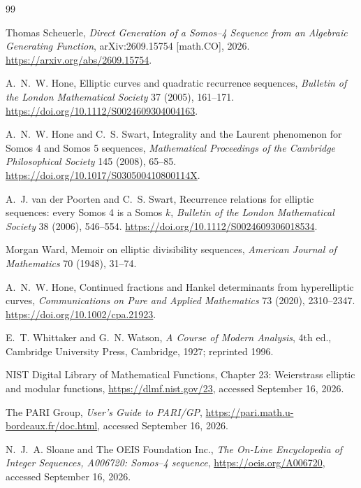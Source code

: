\documentclass[11pt]{article}
\begin{document}

\begin{thebibliography}{99}

Thomas Scheuerle,
\newblock \emph{Direct Generation of a Somos--4 Sequence from an Algebraic
Generating Function},
\newblock arXiv:2609.15754 [math.CO], 2026.
\newblock \url{https://arxiv.org/abs/2609.15754}.

A.~N.~W. Hone,
\newblock Elliptic curves and quadratic recurrence sequences,
\newblock \emph{Bulletin of the London Mathematical Society} 37 (2005),
161--171.
\newblock \url{https://doi.org/10.1112/S0024609304004163}.

A.~N.~W. Hone and C.~S. Swart,
\newblock Integrality and the Laurent phenomenon for Somos 4 and Somos 5
sequences,
\newblock \emph{Mathematical Proceedings of the Cambridge Philosophical
Society} 145 (2008), 65--85.
\newblock \url{https://doi.org/10.1017/S030500410800114X}.

A.~J. van der Poorten and C.~S. Swart,
\newblock Recurrence relations for elliptic sequences: every Somos 4 is a
Somos $k$,
\newblock \emph{Bulletin of the London Mathematical Society} 38 (2006),
546--554.
\newblock \url{https://doi.org/10.1112/S0024609306018534}.

Morgan Ward,
\newblock Memoir on elliptic divisibility sequences,
\newblock \emph{American Journal of Mathematics} 70 (1948), 31--74.

A.~N.~W. Hone,
\newblock Continued fractions and Hankel determinants from hyperelliptic
curves,
\newblock \emph{Communications on Pure and Applied Mathematics} 73 (2020),
2310--2347.
\newblock \url{https://doi.org/10.1002/cpa.21923}.

E.~T. Whittaker and G.~N. Watson,
\newblock \emph{A Course of Modern Analysis}, 4th ed.,
\newblock Cambridge University Press, Cambridge, 1927; reprinted 1996.

NIST Digital Library of Mathematical Functions,
\newblock Chapter 23: Weierstrass elliptic and modular functions,
\newblock \url{https://dlmf.nist.gov/23}, accessed September 16, 2026.

The PARI Group,
\newblock \emph{User's Guide to PARI/GP},
\newblock \url{https://pari.math.u-bordeaux.fr/doc.html}, accessed
September 16, 2026.

N.~J.~A. Sloane and The OEIS Foundation Inc.,
\newblock \emph{The On-Line Encyclopedia of Integer Sequences, A006720:
Somos--4 sequence},
\newblock \url{https://oeis.org/A006720}, accessed September 16, 2026.

\end{thebibliography}
\end{document}
